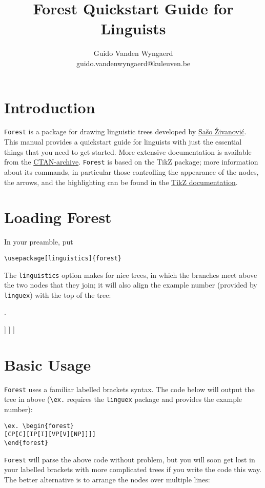 \documentclass[12pt]{article}
\title{Forest Quickstart Guide for Linguists}
\author{Guido Vanden Wyngaerd\\
guido.vandenwyngaerd@kuleuven.be}
\begin{document}
\maketitle

\tableofcontents

\section{Introduction}

\texttt{Forest} is a package for drawing linguistic trees developed by \href{http://spj.ff.uni-lj.si/zivanovic/}{Sašo Živanović}. This manual provides a quickstart guide for linguists with just the essential things that you need to get started. More extensive documentation is available from the \href{https://www.ctan.org/pkg/forest}{CTAN-archive}. \texttt{Forest} is based on the TikZ package; more information about its commands, in particular those controlling the appearance of the nodes, the arrows, and the highlighting can be found in the \href{https://sourceforge.net/projects/pgf/}{TikZ documentation}.

\section{Loading Forest}

In your preamble, put \begin{verbatim}
\usepackage[linguistics]{forest}\end{verbatim}
The \texttt{linguistics} option makes for nice trees, in which the branches meet above the two nodes that they join; it will also align the example number (provided by \texttt{linguex}) with the top of the tree:

\ex.\label{1}
\begin{forest}
[CP [C] 
	[IP [I] 
		[VP [V]
			[NP]  
		] 
	] 
]
\end{forest}


\section{Basic Usage}

\texttt{Forest} uses a familiar labelled brackets syntax. The code below will output the tree in \Last above (\verb|\ex.| requires the \texttt{linguex} package and provides the example number):

\begin{lstlisting}[basicstyle=\ttfamily,basewidth=0.5em]
\ex. \begin{forest}
[CP[C][IP[I][VP[V][NP]]]]
\end{forest}
\end{lstlisting}
\texttt{Forest} will parse the above code without problem, but you will soon get lost in your labelled brackets with more complicated trees if you write the code this way. The better alternative is to arrange the nodes over multiple lines:
\end{document}

